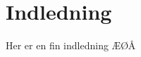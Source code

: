 \documentclass[../main]{subfiles}
\begin{document}
\section{Indledning}
\label{sec:indledning}


Her er en fin indledning ÆØÅ
\end{document}
